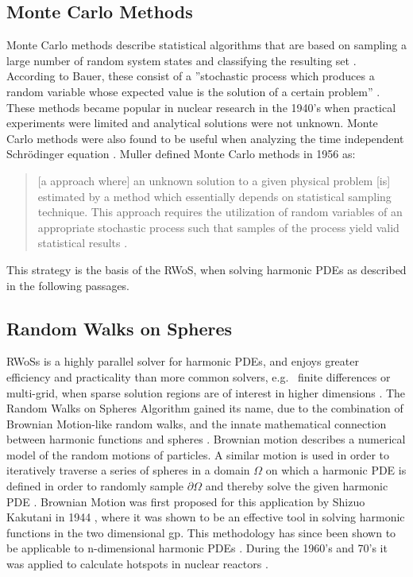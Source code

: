 \subsection{Monte Carlo Methods}\label{ssec:montecarlo}
Monte Carlo methods describe statistical algorithms that are based on sampling a
large number of random system states and classifying the resulting set \cite{Metropolis}.
According to Bauer, these consist of a ''stochastic process which produces a random variable
 whose expected value is the solution of a certain problem'' \cite{bauer}.
These methods became popular in nuclear research in the 1940's when practical
experiments were limited and analytical solutions were not unknown.  Monte Carlo
methods were also found to be useful when analyzing the time independent Schr\"odinger
equation \cite{Metropolis}. Muller defined Monte Carlo methods in 1956 as:
\begin{quote}[a approach where] an unknown solution to a given physical
problem [is] estimated by a method which essentially depends on statistical sampling technique.
This approach requires the utilization of random variables of an appropriate
stochastic process such that samples of the process yield valid statistical
results \cite{Muller}.\end{quote}
This strategy is the basis of the \Gls{RWoS}, when solving harmonic
\Glspl{PDE} as described in the following passages.
\subsection{Random Walks on Spheres}\label{ssec:RWoS}
 \Glspl{RWoS} is a highly parallel solver for harmonic \Glspl{PDE},
and enjoys greater efficiency and practicality than more common solvers, e.g.~
finite differences or multi-grid, when sparse solution regions are of
interest in higher dimensions \cite{DeLaurentis,Bornemann,Yang}.
The Random Walks on Spheres Algorithm
gained its name, due to the combination of Brownian Motion-like random walks,
and the innate mathematical connection between
harmonic functions and spheres \cite{Axler1992}.
Brownian motion describes a numerical model
of the random motions of particles.  A similar motion is used in order to iteratively
traverse a series %
of spheres in a domain $\Omega$ on which a harmonic PDE is defined in order to
randomly sample $\partial \Omega$ and thereby %
solve the given harmonic PDE \cite{DeLaurentis}.
Brownian Motion
was first
proposed for this application by Shizuo Kakutani in 1944 \cite{kakutani1944},
where it was shown to be an effective tool
in solving harmonic functions in the two dimensional \Gls{gp}. This methodology has since been
shown to be applicable to n-dimensional harmonic \glspl{PDE} \cite{DeLaurentis}.  During the 1960's
and 70's it was applied to calculate hotspots in nuclear reactors \cite{Bornemann}.

